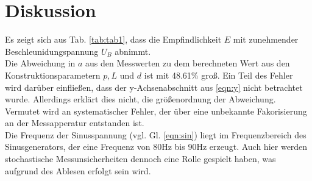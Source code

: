 \section{Diskussion}
Es zeigt sich aus Tab. \ref{tab:tab1}, dass die Empfindlichkeit $E$ mit zunehmender
Beschleunidungspannung $U_B$ abnimmt.\\

Die Abweichung in $a$ aus den Messwerten zu dem berechneten Wert aus den Konstruktionsparametern
$p, L$ und $d$ ist mit 48.61\% groß.
Ein Teil des Fehler wird darüber einfließen, dass der y-Achsenabschnitt aus \ref{eqn:y} nicht betrachtet wurde.
Allerdings erklärt dies nicht, die größenordnung der Abweichung.
Vermutet wird an systematischer Fehler, der über eine unbekannte Fakorisierung an der Messapperatur
entstanden ist.\\

Die Frequenz der Sinusspannung (vgl. Gl. \ref{eqn:sin}) liegt im Frequenzbereich 
des Sinusgenerators, der eine Frequenz von 80Hz bis 90Hz erzeugt. Auch hier werden stochastische Messunsicherheiten dennoch
eine Rolle gespielt haben, was aufgrund des Ablesen erfolgt sein wird.
\label{sec:Diskussion}
